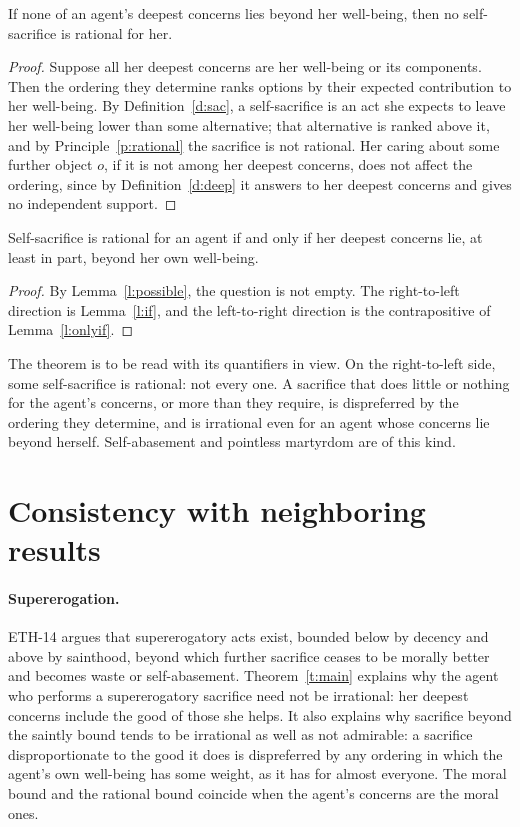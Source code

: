 \documentclass{situationist-preprint}
\begin{document}
\begin{lemma}\label{l:onlyif}
If none of an agent's deepest concerns lies beyond her well-being, then no self-sacrifice is rational for her.
\end{lemma}

\begin{proof}
Suppose all her deepest concerns are her well-being or its components. Then the ordering they determine ranks options by their expected contribution to her well-being. By Definition~\ref{d:sac}, a self-sacrifice is an act she expects to leave her well-being lower than some alternative; that alternative is ranked above it, and by Principle~\ref{p:rational} the sacrifice is not rational. Her caring about some further object $o$, if it is not among her deepest concerns, does not affect the ordering, since by Definition~\ref{d:deep} it answers to her deepest concerns and gives no independent support.
\end{proof}

\begin{theorem}\label{t:main}
Self-sacrifice is rational for an agent if and only if her deepest concerns lie, at least in part, beyond her own well-being.
\end{theorem}

\begin{proof}
By Lemma~\ref{l:possible}, the question is not empty. The right-to-left direction is Lemma~\ref{l:if}, and the left-to-right direction is the contrapositive of Lemma~\ref{l:onlyif}.
\end{proof}

The theorem is to be read with its quantifiers in view. On the right-to-left side, some self-sacrifice is rational: not every one. A sacrifice that does little or nothing for the agent's concerns, or more than they require, is dispreferred by the ordering they determine, and is irrational even for an agent whose concerns lie beyond herself. Self-abasement and pointless martyrdom are of this kind.

\section{Consistency with neighboring results}

\paragraph{Supererogation.} ETH-14 argues that supererogatory acts exist, bounded below by decency and above by sainthood, beyond which further sacrifice ceases to be morally better and becomes waste or self-abasement. Theorem~\ref{t:main} explains why the agent who performs a supererogatory sacrifice need not be irrational: her deepest concerns include the good of those she helps. It also explains why sacrifice beyond the saintly bound tends to be irrational as well as not admirable: a sacrifice disproportionate to the good it does is dispreferred by any ordering in which the agent's own well-being has some weight, as it has for almost everyone. The moral bound and the rational bound coincide when the agent's concerns are the moral ones.
\end{document}

